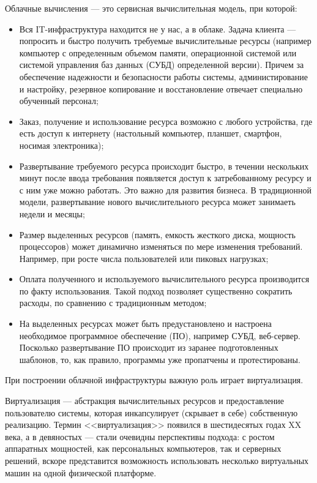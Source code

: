 Облачные вычисления --- это сервисная вычислительная модель, при которой:
\begin{itemize}
  \item Вся IT-инфраструктура находится не у нас, а в облаке.
  Задача клиента --- попросить и быстро получить требуемые вычислительные ресурсы (например компьютер с определенным объемом памяти, операционной системой или системой управления баз данных (СУБД) определенной версии).
  Причем за обеспечение надежности и безопасности работы системы, администирование и настройку, резервное копирование и восстановление отвечает специально обученный персонал;
  \item Заказ, получение и использование ресурса возможно с любого устройства, где есть доступ к интернету (настольный компьютер, планшет, смартфон, носимая электроника);
  \item Развертывание требуемого ресурса происходит быстро, в течении нескольких минут после ввода требования появляется доступ к затребованному ресурсу и с ним уже можно работать.
  Это важно для развития бизнеса.
  В традиционной модели, развертывание нового вычислительного ресурса может занимаеть недели и месяцы;
  \item Размер выделенных ресурсов (память, емкость жесткого диска, мощность процессоров) может динамично изменяться по мере изменения требований.
  Например, при росте числа пользователей или пиковых нагрузках;
  \item Оплата полученного и используемого вычислительного ресурса производится по факту использования.
  Такой подход позволяет существенно сократить расходы, по сравнению с традиционным методом;
  \item На выделенных ресурсах может быть предустановлено и настроена необходимое программное обеспечение (ПО), например СУБД, веб-сервер.
  Посколько развертывание ПО происходит из заранее подготовленных шаблонов, то, как правило, программы уже пропатчены и протестированы.
\end{itemize}

При построении облачной инфраструктуры важную роль играет виртуализация.

Виртуализация --- абстракция вычислительных ресурсов и предоставление пользователю системы, которая инкапсулирует (скрывает в себе) собственную реализацию.
Термин <<виртуализация>> появился в шестидесятых годах XX века, а в девяностых --- стали очевидны перспективы подхода: с ростом аппаратных мощностей, как персональных компьютеров, так и серверных решений, вскоре представится возможность использовать несколько виртуальных машин на одной физической платформе.

